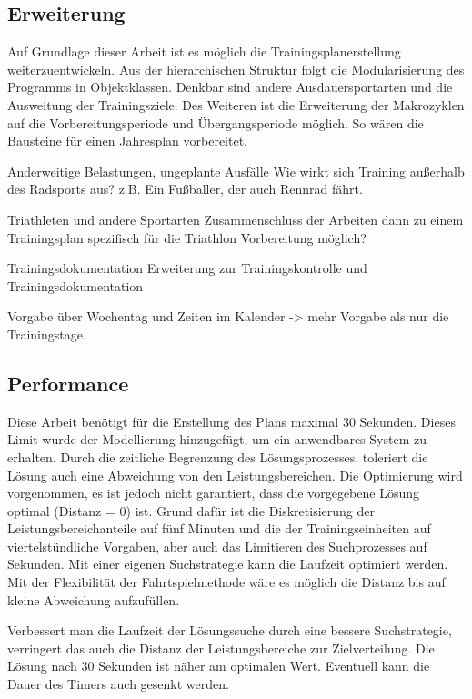 \subsection{Erweiterung} 
Auf Grundlage dieser Arbeit ist es möglich die Trainingsplanerstellung weiterzuentwickeln. 
Aus der hierarchischen Struktur folgt die Modularisierung des Programms in Objektklassen.
Denkbar sind andere Ausdauersportarten und die Ausweitung der Trainingsziele. 
Des Weiteren ist die Erweiterung der Makrozyklen auf die Vorbereitungsperiode und Übergangsperiode möglich. So wären die Bausteine für einen Jahresplan vorbereitet. \par
Anderweitige Belastungen, ungeplante Ausfälle
Wie wirkt sich Training außerhalb des Radsports aus? z.B. Ein Fußballer, der auch Rennrad fährt. \par
Triathleten und andere Sportarten
Zusammenschluss der Arbeiten dann zu einem Trainingsplan spezifisch für die Triathlon Vorbereitung möglich? \par
Trainingsdokumentation
Erweiterung zur Trainingskontrolle und Trainingsdokumentation \par
Vorgabe über Wochentag und Zeiten im Kalender -> mehr Vorgabe als nur die Trainingstage.
    
\subsection{Performance}
Diese Arbeit benötigt für die Erstellung des Plans maximal 30 Sekunden. Dieses Limit wurde der Modellierung hinzugefügt, um ein anwendbares System zu erhalten. Durch die zeitliche Begrenzung des Lösungsprozesses, toleriert die Lösung auch eine Abweichung von den Leistungsbereichen. Die Optimierung wird vorgenommen, es ist jedoch nicht garantiert, dass die vorgegebene Lösung optimal (Distanz = 0) ist. Grund dafür ist die Diskretisierung der Leistungsbereichanteile auf fünf Minuten und die der Trainingseinheiten auf viertelstündliche Vorgaben, aber auch das Limitieren des Suchprozesses auf  Sekunden.
Mit einer eigenen Suchstrategie kann die Laufzeit optimiert werden. Mit der Flexibilität der Fahrtspielmethode wäre es möglich die Distanz bis auf kleine Abweichung aufzufüllen.

Verbessert man die Laufzeit der Lösungssuche durch eine bessere Suchstrategie, verringert das auch die Distanz der Leistungsbereiche zur Zielverteilung. Die Lösung nach 30 Sekunden ist näher am optimalen Wert. Eventuell kann die Dauer des Timers auch gesenkt werden.

